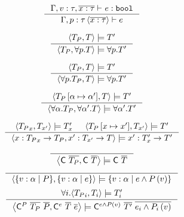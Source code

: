 \documentclass[10pt,a4paper]{article}
\begin{document}




\hfill{}

$$
\inference{
	\hasType{\Gamma, v:\tau, \overline{x:\tau}}{}{e}{\tbool}
}{
	\isWellFormedP{\Gamma}{\pdVar{p}{\tau}{\overline{x:\tau}}}{e}
}[]
$$

\hfill\fbox{\unifyTypes{\pdTy}{\dTy}{\dTy}}

$$
\inference{
	\unifyTypes{\pdTy}{\dTy}{\dTy'}
}{
	\unifyTypes{\pdTy}{\tforallPr{p}{\dTy}}{\tforallPr{p}{\dTy'}}
}[]
$$


$$
\inference{
	\unifyTypes{\pdTy}{\dTy}{\dTy'}
}{
	\unifyTypes{\tforallPr{p}{\pdTy}}{\dTy}{\tforallPr{p}{\dTy'}}
}[]
$$

$$
\inference{
	\unifyTypes{{\pdTy \subT{\alpha}{\alpha'}}}{{\dTy}}{\dTy'}
}{
	\unifyTypes	{\tforallTy{\alpha}{\pdTy}}
				{\tforallTy{\alpha'}{\dTy}}
				{\tforallTy{\alpha'}{\dTy'}}
}[]
$$

$$
\inference{
	\unifyTypes	{\pdTy_x}{\dTy_{x'}}{\dTy_x'} &
	\unifyTypes	{\pdTy \sub{x}{x'}}{\dTy_{x'}}{\dTy'}
}{
	\unifyTypes	{\tfun{x}{{\pdTy_x}}{\pdTy}}
				{\tfun{x'}{\dTy_{x'}}{\dTy}}
				{\tfun{x'}{\dTy_x'}{\dTy'}}
}[]
$$

$$
\inference{
}{
	\unifyTypes	{\tclass{\nhaskell{C}}{\listOf{\pdTy}}}
				{\tclass{\nhaskell{C}}{\listOf{\dTy}}}
				{\tclass{\nhaskell{C}}{\listOf{\dTy}}}
}[]
$$
$$
\inference{
}{
	\unifyTypes	{\tvar{\alpha}{P}} 
				{\tvar{\alpha}{e}}
				{\tvar{\alpha}{e \land \pdapp{P}{v}}}
}[]
$$
$$
\inference{
	\forall i . {\unifyTypes{\pdTy_i}{\dTy_i}{\dTy_i'}}
}{
	\unifyTypes	{\tcon{\nhaskell{C}}{P}{\listOf{\pdTy}}{\listOf{P}}}
				{\tcon{\nhaskell{C}}{e}{\listOf{\dTy}}{\listOf{e}}}
				{\tcon	{\nhaskell{C}}
						{e \land \pdapp{P}{v}}{\listOf{\dTy'}}
						{\listOf{e_i \land \pdapp{P_i}{v}}}
				}
}[]
$$
\end{document}
